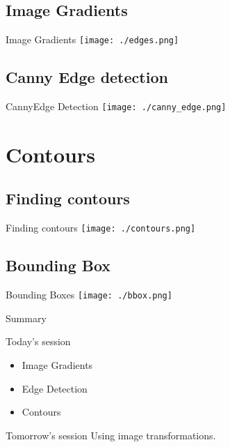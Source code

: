 \documentclass{beamer}
\begin{document}
\subsection{Image Gradients}
\begin{frame}{Image Gradients}
\centering
    \texttt{[image: ./edges.png]}
\end{frame}

\subsection{Canny Edge detection}
\begin{frame}{Canny}{Edge Detection}
\centering
    \texttt{[image: ./canny\_edge.png]}

\end{frame}

\section{Contours}
\subsection{Finding contours}
\begin{frame}{Finding contours}
\centering
    \texttt{[image: ./contours.png]}

\end{frame}
\subsection{Bounding Box}
\begin{frame}{Bounding Boxes}
\centering
    \texttt{[image: ./bbox.png]}

\end{frame}

\begin{frame}{Summary}
    \begin{block}{Today's session}
        \begin{itemize}
              \item Image Gradients
              \item Edge Detection
              \item Contours
        \end{itemize}
    \end{block}
    \begin{block}{Tomorrow's session}
       Using image transformations. 
    \end{block}
\end{frame}
\end{document}
